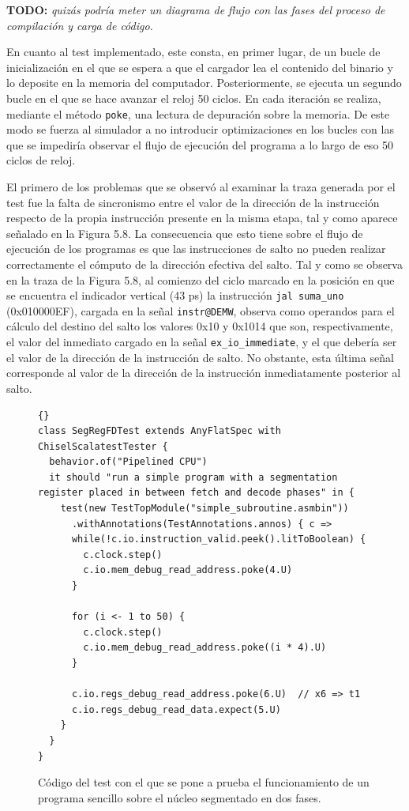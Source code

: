 {\color{red}\textbf{TODO:} \textit{quizás podría meter un diagrama de flujo con las fases del proceso de compilación y carga de código.}}

En cuanto al test implementado, este consta, en primer lugar, de un bucle de inicialización en el que se espera a que el cargador lea el contenido del binario y lo deposite en la memoria del computador. Posteriormente, se ejecuta un segundo bucle en el que se hace avanzar el reloj 50 ciclos. En cada iteración se realiza, mediante el método \texttt{poke}, una lectura de depuración sobre la memoria. De este modo se fuerza al simulador a no introducir optimizaciones en los bucles con las que se impediría observar el flujo de ejecución del programa a lo largo de eso 50 ciclos de reloj.

El primero de los problemas que se observó al examinar la traza generada por el test fue la falta de sincronismo entre el valor de la dirección de la instrucción respecto de la propia instrucción presente en la misma etapa, tal y como aparece señalado en la Figura 5.8. La consecuencia que esto tiene sobre el flujo de ejecución de los programas es que las instrucciones de salto no pueden realizar correctamente el cómputo de la dirección efectiva del salto. Tal y como se observa en la traza de la Figura 5.8, al comienzo del ciclo marcado en la posición en que se encuentra el indicador vertical (43 ps) la instrucción \texttt{jal suma\_uno} (0x010000EF), cargada en la señal \texttt{instr@DEMW}, observa como operandos para el cálculo del destino del salto los valores 0x10 y 0x1014 que son, respectivamente, el valor del inmediato cargado en la señal \texttt{ex\_io\_immediate}, y el que debería ser el valor de la dirección de la instrucción de salto. No obstante, esta última señal corresponde al valor de la dirección de la instrucción inmediatamente posterior al salto.

\begin{figure}[h]
\begin{lstlisting}[style=scalaStyle,columns=fullflexible]{}
class SegRegFDTest extends AnyFlatSpec with ChiselScalatestTester {
  behavior.of("Pipelined CPU")
  it should "run a simple program with a segmentation register placed in between fetch and decode phases" in {
    test(new TestTopModule("simple_subroutine.asmbin"))
      .withAnnotations(TestAnnotations.annos) { c =>
      while(!c.io.instruction_valid.peek().litToBoolean) {
        c.clock.step()
        c.io.mem_debug_read_address.poke(4.U)
      }
      
      for (i <- 1 to 50) {
        c.clock.step()
        c.io.mem_debug_read_address.poke((i * 4).U)
      }

      c.io.regs_debug_read_address.poke(6.U)  // x6 => t1
      c.io.regs_debug_read_data.expect(5.U)
    }
  }
}
\end{lstlisting}
\vspace{-0.4cm}
\caption{Código del test con el que se pone a prueba el funcionamiento de un programa sencillo sobre el núcleo segmentado en dos fases.}
\end{figure}

